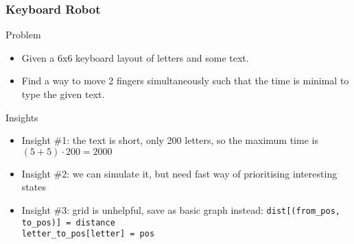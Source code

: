\documentclass{beamer}
\begin{document}
\begin{frame}
    \frametitle{Keyboard Robot}
    \begin{block}{Problem}
        \begin{itemize}
            \item Given a 6x6 keyboard layout of letters and some text.
            \item Find a way to move 2 fingers simultaneously such that the time is minimal to type the given text.
        \end{itemize}
    \end{block} \pause
    \begin{block}{Insights}
        \begin{itemize}
            \item Insight \#1: the text is short, only 200 letters, so the maximum time is $(5+5)\cdot200 = 2000$
            \pause
            \item Insight \#2: we can simulate it, but need fast way of prioritising interesting states
            \pause
            \item Insight \#3: grid is unhelpful, save as basic graph instead: 
                {\tt dist[(from\_pos, to\_pos)] = distance}\\ 
                {\tt letter\_to\_pos[letter] = pos}\\
        \end{itemize}
    \end{block} 
\end{frame}
\end{document}
